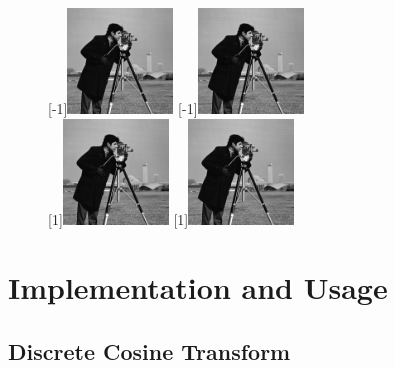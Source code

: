 \begin{figure}[h]
\center
\scalebox{-1}[-1]{\includegraphics[width=0.25\textwidth]{images/appendix/cameraman.png}}
\hspace{-6px}
\scalebox{1}[-1]{\includegraphics[width=0.25\textwidth]{images/appendix/cameraman.png}} \\
\vspace{-2px}
\scalebox{-1}[1]{\includegraphics[width=0.25\textwidth]{images/appendix/cameraman.png}}
\hspace{-6px}
\scalebox{1}[1]{\includegraphics[width=0.25\textwidth]{images/appendix/cameraman.png}}
\label{fig:Reflection}
\end{figure}

\section{Implementation and Usage}

\subsection{Discrete Cosine Transform}


